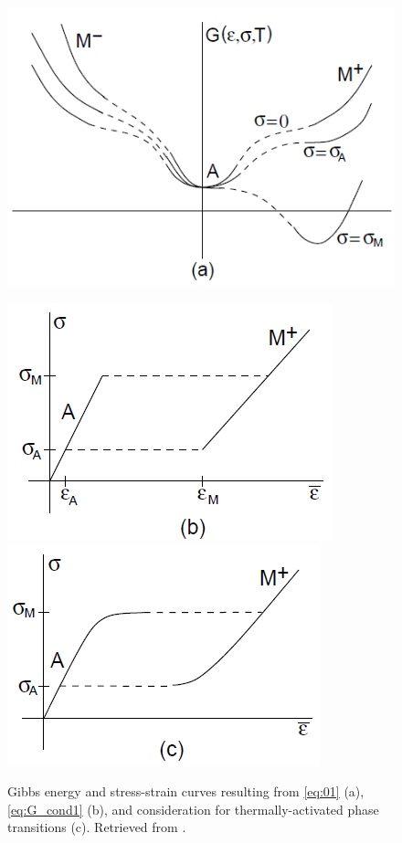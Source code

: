 \begin{multicols}{2}
\begin{figure}[H]
    \centering
    \includegraphics[scale=0.47]{._figures/G_curves_a.png}
\end{figure}

\begin{figure}[H]
    \centering
    \includegraphics[scale=0.5]{._figures/G_curves_b.png}
    \includegraphics[scale=0.5]{._figures/G_curves_c.png}
    \caption[Gibbs energy and stress-strain curves]{Gibbs energy and stress-strain curves resulting from \ref{eq:01} (a), \ref{eq:G_cond1} (b), and consideration for thermally-activated phase transitions (c). Retrieved from \cite{smith2005smart}.}
    \label{fig:G_curves}
\end{figure}


\end{multicols}

